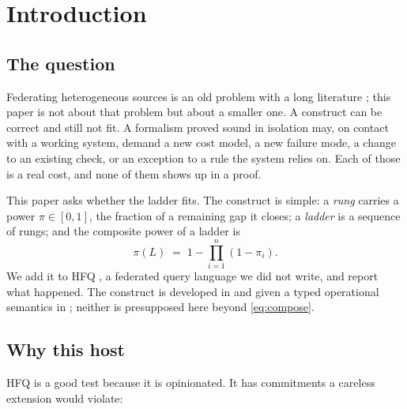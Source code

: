 \documentclass[11pt,twocolumn,a4paper]{article}
\theoremstyle{plain}
\theoremstyle{definition}
\theoremstyle{remark}
\newcommand{\pow}{\pi}
\newcommand{\Lad}{L}
\begin{document}
\tableofcontents

\section{Introduction}
\label{sec:intro}

\subsection{The question}

Federating heterogeneous sources is an old problem with a long literature
\citep{halevy2006pdms}; this paper is not about that problem but about a
smaller one. A construct can be correct and still not fit. A formalism proved sound in
isolation may, on contact with a working system, demand a new cost model, a new
failure mode, a change to an existing check, or an exception to a rule the
system relies on. Each of those is a real cost, and none of them shows up in a
proof.

This paper asks whether the ladder fits. The construct is simple: a
\emph{rung} carries a power $\pow\in[0,1]$, the fraction of a remaining gap it
closes; a \emph{ladder} is a sequence of rungs; and the composite power of a
ladder is
\begin{equation}
\pow(\Lad)\;=\;1-\prod_{i=1}^{n}(1-\pow_i).
\label{eq:compose}
\end{equation}
We add it to HFQ \citep{sachikonye2026hfq}, a federated query language we did
not write, and report what happened. The construct is developed in
\citet{sachikonye2026ladder} and given a typed operational semantics in
\citet{sachikonye2026shkladder}; neither is presupposed here beyond
\cref{eq:compose}.

\subsection{Why this host}

HFQ \citep{sachikonye2026hfq} is a good test because it is opinionated. It has
commitments a careless extension would violate:
\end{document}
